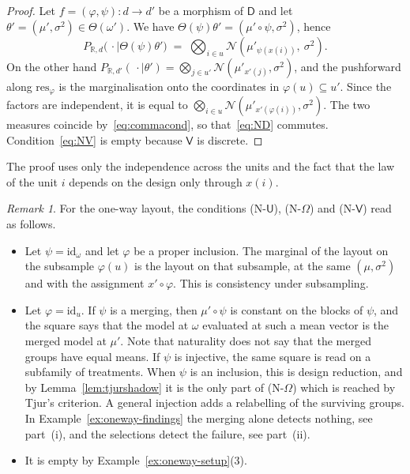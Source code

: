 \documentclass[11pt,a4paper]{article}
\theoremstyle{plain}
\theoremstyle{definition}
\theoremstyle{remark}
\newtheorem{remark}[theorem]{Remark}
\newcommand{\cat}[1]{\mathsf{#1}}
\newcommand{\catU}{\cat{U}}
\newcommand{\catV}{\cat{V}}
\newcommand{\catO}{\cat{\Omega}}
\newcommand{\catD}{\cat{D}}
\newcommand{\id}{\mathrm{id}}
\newcommand{\R}{\mathbb{R}}
\newcommand{\Norm}{\mathcal{N}}
\newcommand{\res}{\mathrm{res}}
\begin{document}
\begin{proof}
Let $f = (\varphi,\psi) \colon d \to d'$ be a morphism of $\catD$ and let
$\theta' = (\mu',\sigma^{2}) \in \Theta(\omega')$. We have
$\Theta(\psi)\theta' = (\mu' \circ \psi,\sigma^{2})$, hence
\[
P_{\R,d}\bigl(\,\cdot \mid \Theta(\psi)\theta'\bigr)
\;=\; \bigotimes_{i \in u} \Norm(\mu'_{\psi(x(i))},\ \sigma^{2}).
\]
On the other hand
$P_{\R,d'}(\,\cdot \mid \theta') = \bigotimes_{j \in u'}
\Norm(\mu'_{x'(j)},\sigma^{2})$, and the pushforward along $\res_{\varphi}$ is
the marginalisation onto the coordinates in $\varphi(u) \subseteq u'$. Since
the factors are independent, it is equal to
$\bigotimes_{i \in u} \Norm(\mu'_{x'(\varphi(i))},\sigma^{2})$. The two
measures coincide by~\eqref{eq:commacond}, so that~\eqref{eq:ND} commutes.
Condition~\eqref{eq:NV} is empty because $\catV$ is discrete.
\end{proof}

The proof uses only the independence across the units and the fact that the
law of the unit $i$ depends on the design only through $x(i)$.

\begin{remark}\label{rem:oneway-slots}
For the one-way layout, the conditions (N-$\catU$), (N-$\catO$) and
(N-$\catV$) read as follows.
\begin{itemize}
\item[(N-$\catU$)] Let $\psi = \id_{\omega}$ and let $\varphi$ be a proper
inclusion. The marginal of the layout on the subsample $\varphi(u)$ is the
layout on that subsample, at the same $(\mu,\sigma^{2})$ and with the
assignment $x' \circ \varphi$. This is consistency under subsampling.
\item[(N-$\catO$)] Let $\varphi = \id_{u}$. If $\psi$ is a merging, then
$\mu' \circ \psi$ is constant on the blocks of $\psi$, and the square says
that the model at $\omega$ evaluated at such a mean vector is the merged model
at $\mu'$. Note that naturality does not say that the merged groups have equal
means. If $\psi$ is injective, the same square is read on a subfamily of
treatments. When $\psi$ is an inclusion, this is design reduction, and by
Lemma~\ref{lem:tjurshadow} it is the only part of (N-$\catO$) which is reached
by Tjur's criterion. A general injection adds a relabelling of the surviving
groups. In Example~\ref{ex:oneway-findings} the merging alone detects nothing,
see part~(i), and the selections detect the failure, see part~(ii).
\item[(N-$\catV$)] It is empty by
Example~\ref{ex:oneway-setup}(3).
\end{itemize}
\end{remark}
\end{document}
